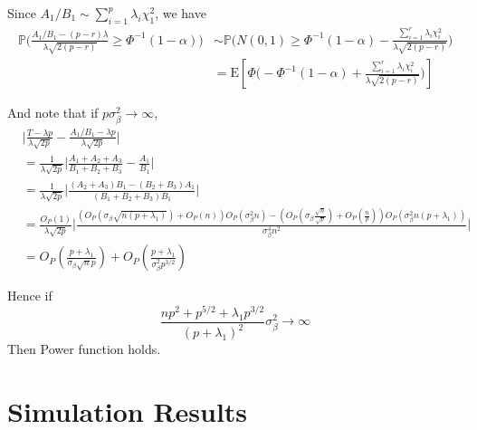 \documentclass[review]{elsarticle}
\theoremstyle{plain}
\theoremstyle{definition}
\theoremstyle{remark}
\begin{document}
Since $A_1/B_1\sim \sum_{i=1}^p \lambda_i \chi^2_1$, we have
\begin{equation}
    \begin{aligned}
    \mathbb{P}\Big(\frac{A_1/B_1-(p-r)\lambda}{\lambda\sqrt{2(p-r)}}\geq \Phi^{-1}(1-\alpha)\Big)
        &\sim\mathbb{P}\Big(N(0,1)\geq \Phi^{-1}(1-\alpha)-\frac{\sum_{i=1}^r \lambda_i \chi^2_i}{\lambda\sqrt{2(p-r)}}\Big)\\
        &=\textrm{E}[\Phi\Big(-\Phi^{-1}(1-\alpha)+\frac{\sum_{i=1}^r \lambda_i \chi^2_i}{\lambda\sqrt{2(p-r)}}\Big)]
    \end{aligned}
\end{equation}

And note that if $p \sigma_{\beta}^2\to \infty$,
\begin{equation}
    \begin{aligned}
        &\Big|\frac{T-{\lambda p}}{\lambda\sqrt{2p}
        }-
    \frac{{A_1}/{B_1}-{\lambda p}}{\lambda\sqrt{2p}
        }\Big|\\
        &=
        \frac{1}{\lambda\sqrt{2p}}
        \Big|
        \frac{A_1+A_2+A_3}{B_1+B_2+B_3}-\frac{A_1}{B_1}
        \Big|\\
        &=
        \frac{1}{\lambda\sqrt{2p}}
        \Big|
        \frac{(A_2+A_3)B_1-(B_2+B_3)A_1}{(B_1+B_2+B_3)B_1}
        \Big|\\
        &=
        \frac{O_{P}(1)}{\lambda\sqrt{2p}}
        \Big|
        \frac{(O_P(\sigma_{\beta}\sqrt{n(p+\lambda_1)})+O_P(n))O_P(\sigma^2_\beta n)-(O_P(\sigma_{\beta}\frac{\sqrt{n}}{\sqrt{p}})+O_P(\frac{n}{p}))O_P(\sigma^2_{\beta} n(p+\lambda_1))}{\sigma^4_{\beta}n^2}
        \Big|\\
        &=O_P(\frac{p+\lambda_1}{\sigma_{\beta}\sqrt{n}p})+O_P(\frac{p+\lambda_1}{\sigma^2_{\beta}p^{3/2}})
    \end{aligned}
\end{equation}

Hence if 
\begin{equation}
    \frac{np^2+p^{5/2}+\lambda_1 p^{3/2}}{{(p+\lambda_1)}^2}\sigma^2_{\beta}\to \infty
\end{equation}
Then Power function holds.

\section{Simulation Results}
\end{document}
